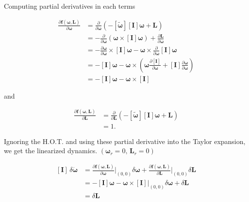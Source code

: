 \documentclass[12pt, a4paper]{article}
\begin{document}
Computing partial derivatives in each terms

\begin{equation*}
    \begin{split}
        \frac{\partial\bm{f}(\bm{\omega},\bm{L})}{\partial\bm{\omega}}
        &=\frac{\partial}{\partial\bm{\omega}}\left(-[\tilde{\bm{\omega}}][\bm{I}]\bm{\omega}+\bm{L}\right)\\
        &=-\frac{\partial}{\partial\bm{\omega}}(\bm{\omega}\times[\bm{I}]\bm{\omega})+\frac{\partial\bm{L}}{\partial\bm{\omega}}\\
        &=-\frac{\partial\bm{\omega}}{\partial\bm{\omega}}\times[\bm{I}]\bm{\omega}-\bm{\omega}\times\frac{\partial}{\partial\bm{\omega}}[\bm{I}]\bm{\omega}\\
        &=-[\bm{I}]\bm{\omega}-\bm{\omega}\times\left(\bm{\omega}\frac{\partial[\bm{I}]}{\partial\bm{\omega}}+\bm{[I]}\frac{\partial\bm{\omega}}{\partial\bm{\omega}}\right)\\
        &=-[\bm{I}]\bm{\omega}-\bm{\omega}\times[\bm{I}]
    \end{split}
\end{equation*}

and

\begin{equation*}
    \begin{split}
        \frac{\partial\bm{f}(\bm{\omega},\bm{L})}{\partial\bm{L}}
        &=\frac{\partial}{\partial\bm{L}}\left(-[\tilde{\bm{\omega}}][\bm{I}]\bm{\omega} + \bm{L}\right)\\
        &=1.
    \end{split}
\end{equation*}

Ignoring the H.O.T. and using these partial derivative into the Taylor expansion, we get the linearized dynamics. $(\bm{\omega}_{r}=0,\,\bm{L}_{r}=0)$

\begin{equation*}
    \begin{split}
        [\bm{I}]\,\delta\dot{\bm{\omega}}
        &=\frac{\partial\bm{f}(\bm{\omega},\bm{L})}{\partial \bm{\omega}}\biggr\rvert_{(0,0)}\delta\bm{\omega}+\frac{\partial\bm{f}(\bm{\omega},\bm{L})}{\partial\bm{L}}\biggr\rvert_{(0,0)}\delta\bm{L} \\
        &=-[\bm{I}]\bm{\omega}-\bm{\omega}\times[\bm{I}]\biggr\rvert_{(0,0)}\delta\bm{\omega} + \delta\bm{L}\\
        &= \delta\bm{L}
    \end{split}
\end{equation*}
\end{document}
